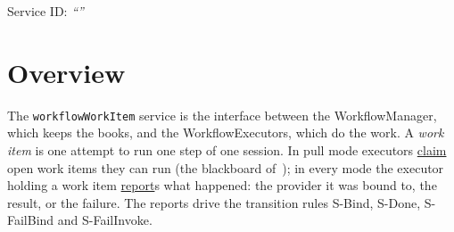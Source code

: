 \documentclass[a4paper]{arrowhead}
\newcommand{\oref}[1]{{\textcolor{ArrowheadBlue}{\hyperref[sec:operations:#1]{#1}}}}
\begin{document}
\ArrowheadSetup

\begin{center}
  \vspace*{1cm}
  \huge{\arrowtitle}

  \vspace*{0.2cm}
  \LARGE{\arrowtype}
  \vspace*{1cm}

  \Large{Service ID: \textit{``\arrowid''}}
  \vspace*{\fill}

  

  \vspace*{1cm}
  \vspace*{\fill}

  \begin{abstract}
    This document describes the \texttt{workflow\allowbreak{}Work\allowbreak{}Item} service of the Eclipse Arrowhead workflow support systems, which lets executors claim work items and report their outcome. It is provided by the WorkflowManager system, service version 1.0.0, documentation edition 5.4.0.
  \end{abstract}

  \vspace*{1cm}
\end{center}

\newpage

\tableofcontents
\newpage

\section{Overview}
\label{sec:overview}
The \texttt{workflow\allowbreak{}Work\allowbreak{}Item} service is the interface between the WorkflowManager, which keeps the
books, and the WorkflowExecutors, which do the work. A \emph{work item} is one attempt to run one step of one session.
In pull mode executors \oref{claim} open work items they can run (the blackboard of~\cite{derhamy2018workflow}); in
every mode the executor holding a work item \oref{report}s what happened: the provider it was bound to, the result, or
the failure. The reports drive the transition rules S-Bind, S-Done, S-FailBind and S-FailInvoke.
\end{document}
